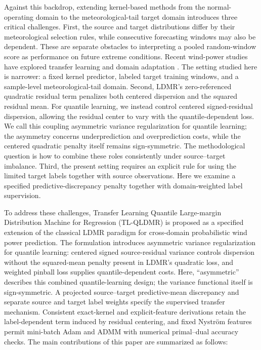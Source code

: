 \documentclass[a4paper]{cas-sc}
\begin{document}
Against this backdrop, extending kernel-based methods from the normal-operating domain to the {\color{blue}meteorological-tail target domain} introduces three critical challenges. {\color{blue}First, the source and target distributions differ by their meteorological selection rules, while consecutive forecasting windows may also be dependent. These are separate obstacles to interpreting a pooled random-window score as performance on future extreme conditions.} Recent wind-power studies have explored transfer learning and domain adaptation \citep{yin2021serioparallel, wang2024scarcity, dong2023mdan}. {\color{blue}The setting studied here is narrower: a fixed kernel predictor, labeled target training windows, and a sample-level meteorological-tail domain. Second, LDMR's zero-referenced quadratic residual term penalizes both centered dispersion and the squared residual mean. For quantile learning, we instead control centered signed-residual dispersion, allowing the residual center to vary with the quantile-dependent loss. We call this coupling asymmetric variance regularization for quantile learning; the asymmetry concerns underprediction and overprediction costs, while the centered quadratic penalty itself remains sign-symmetric. The methodological question is how to combine these roles consistently under source--target imbalance. Third, the present setting requires an explicit rule for using the limited target labels together with source observations. Here we examine a specified predictive-discrepancy penalty together with domain-weighted label supervision.}


To address these challenges, Transfer Learning Quantile Large-margin Distribution Machine for Regression (TL-QLDMR) is proposed as a {\color{blue}specified} extension of the classical LDMR paradigm for cross-domain probabilistic wind power prediction. {\color{blue}The formulation introduces asymmetric variance regularization for quantile learning: centered signed source-residual variance controls dispersion without the squared-mean penalty present in LDMR's quadratic loss, and weighted pinball loss supplies quantile-dependent costs. Here, ``asymmetric'' describes this combined quantile-learning design; the variance functional itself is sign-symmetric. A projected source--target predictive-mean discrepancy and separate source and target label weights specify the supervised transfer mechanism. Consistent exact-kernel and explicit-feature derivations retain the label-dependent term induced by residual centering, and fixed Nystr\"{o}m features permit mini-batch Adam and ADMM with numerical primal--dual accuracy checks.} The main contributions of this paper are summarized as follows:
\end{document}
